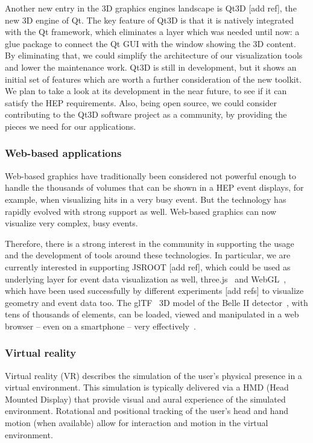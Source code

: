 \documentclass[12pt,a4paper]{article}
\begin{document}
Another new entry in the 3D graphics engines landscape is Qt3D [add ref],  the new 3D engine of Qt. The key feature of
Qt3D is that it is natively integrated with the Qt framework, which eliminates a layer which was needed until now: a glue
package to connect the Qt GUI with the window showing the 3D content. By eliminating that, we could simplify the architecture
of our visualization tools and lower the maintenance work. Qt3D is still in development, but it shows an initial set of
features which are worth a further consideration of the new toolkit. We plan to take a look at its development in the near future,
to see if it can satisfy the HEP requirements. Also, being open source, we could consider contributing to the Qt3D software
project as a community, by providing the pieces we need for our applications.

\hypertarget{web-based}{%
\subsubsection{Web-based applications}\label{web-based}}

Web-based graphics have traditionally been considered not powerful enough to handle the thousands of volumes that can be
shown in a HEP event displays, for example, when visualizing hits in a very busy event. But the technology has rapidly
evolved with strong support as well. Web-based graphics can now visualize very complex, busy events.

Therefore, there is a strong interest in the community in supporting the usage and the development of tools around
these technologies. In particular, we are currently interested in supporting JSROOT [add ref], which could be used as
underlying layer for event data visualization as well, three.js~\cite{ThreeJSXXXX} and WebGL~\cite{WebGL2011}, which have been
used successfully by different experiments [add refs] to visualize geometry and event data too. The glTF~\cite{glTF} 3D model
of the Belle II detector~\cite{BelleII}, with tens of thousands of elements, can be loaded, viewed and manipulated in a web
browser – even on a smartphone – very effectively~\cite{SketchFabBelleII}.

\hypertarget{vr}{%
\subsubsection{Virtual reality}\label{vr}}

Virtual reality (VR) describes the simulation of the user’s physical presence in a virtual environment. This simulation
is typically delivered via a HMD (Head Mounted Display) that provide visual and aural experience of the simulated environment.
Rotational and positional tracking of the user’s head and hand motion (when available) allow for interaction and motion
in the virtual environment.
\end{document}
